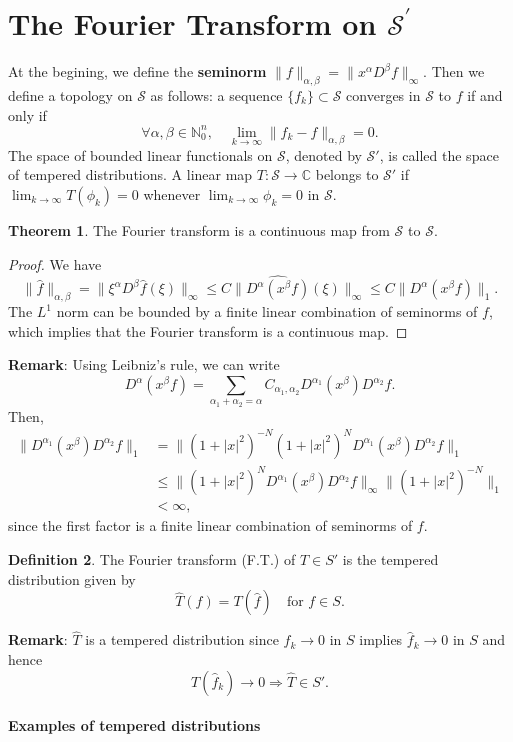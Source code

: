 \documentclass[12pt,openany]{book}
\theoremstyle{definition}
\newtheorem{theorem}{Theorem}[section]
\newtheorem{definition}[theorem]{Definition}
\begin{document}
\section{The Fourier Transform on $\mathcal{S}^{\prime}$}
At the begining, we define the \textbf{seminorm} $\|f\|_{\alpha, \beta}=\|x^\alpha D^\beta f\|_{\infty}$. Then we define a topology on $\mathcal{S}$ as follows: a sequence $\{f_k\} \subset \mathcal{S}$ converges in $\mathcal{S}$ to $f$ if and only if
$$
\forall \alpha, \beta \in \mathbb{N}_0^n, \quad \lim_{k \rightarrow \infty} \|f_k - f\|_{\alpha, \beta} = 0.
$$
The space of bounded linear functionals on $\mathcal{S}$, denoted by $\mathcal{S}'$, is called the space of tempered distributions. A linear map $T: \mathcal{S} \rightarrow \mathbb{C}$ belongs to $\mathcal{S}'$ if $\lim_{k \rightarrow \infty} T(\phi_k) = 0$ whenever $\lim_{k \rightarrow \infty} \phi_k = 0$ in $\mathcal{S}$.
\begin{theorem}
    The Fourier transform is a continuous map from $\mathcal{S}$ to $\mathcal{S}$.
\end{theorem}
\begin{proof}
    We have
$$
\|\hat{f}\|_{\alpha, \beta} = \|\xi^\alpha D^\beta \hat{f}(\xi)\|_{\infty} \leq C\|\widehat{D^\alpha(x^\beta f)}(\xi)\|_{\infty} \leq C\|D^\alpha(x^\beta f)\|_1.
$$
The $L^1$ norm can be bounded by a finite linear combination of seminorms of $f$, which implies that the Fourier transform is a continuous map.
\end{proof}
\noindent\textbf{Remark}: Using Leibniz's rule, we can write
$$
D^\alpha(x^\beta f) = \sum_{\alpha_1 + \alpha_2 = \alpha} C_{\alpha_1, \alpha_2} D^{\alpha_1}(x^\beta) D^{\alpha_2}f.
$$
Then,
$$
\begin{aligned}
\|D^{\alpha_1}(x^\beta) D^{\alpha_2}f\|_1 &= \|(1 + |x|^2)^{-N}(1 + |x|^2)^N D^{\alpha_1}(x^\beta) D^{\alpha_2}f\|_1 \\
&\leq \|(1 + |x|^2)^N D^{\alpha_1}(x^\beta) D^{\alpha_2}f\|_{\infty} \|(1 + |x|^2)^{-N}\|_1 \\
&< \infty,
\end{aligned}
$$
since the first factor is a finite linear combination of seminorms of $f$.
\begin{definition}
    The Fourier transform (F.T.) of $T \in S'$ is the tempered distribution given by
    $$
\hat{T}(f) = T(\hat{f}) \quad \text{for } f \in S.
$$
\end{definition}
\noindent\textbf{Remark}:  $\hat{T}$ is a tempered distribution since $f_k \rightarrow 0$ in $S$ implies $\hat{f}_k \rightarrow 0$ in $S$ and hence
$$
T(\hat{f}_k) \rightarrow 0 \Rightarrow \hat{T} \in S'.
$$
~\\
\textbf{\large{Examples of tempered distributions}}
\end{document}
